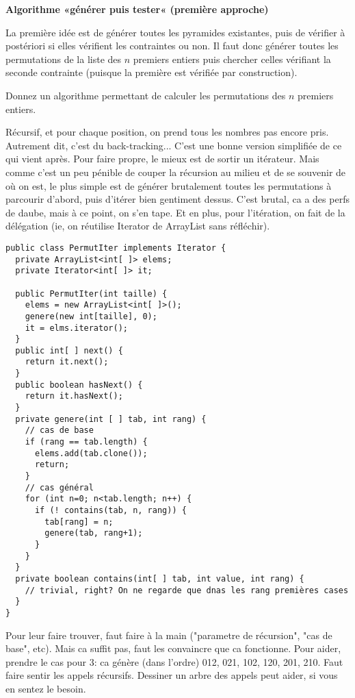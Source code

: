 \documentclass[10pt]{article}\usepackage[correction,nu]{esial}
\begin{document}
\begin{Exercice}\textbf{Algorithme «générer puis tester« (première approche)}

  \noindent La première idée est de générer toutes les pyramides existantes,
  puis de vérifier à postériori si elles vérifient les contraintes ou non. Il
  faut donc générer toutes les permutations de la liste des $n$ premiers
  entiers puis chercher celles vérifiant la seconde contrainte (puisque la
  première est vérifiée par construction).
\end{Exercice}

\begin{Question}
  Donnez un algorithme permettant de calculer les permutations des $n$ premiers
  entiers.
\end{Question}
\begin{Reponse}
  Récursif, et pour chaque position, on prend tous les nombres pas encore
  pris. Autrement dit, c'est du back-tracking... C'est une bonne version
  simplifiée de ce qui vient après. Pour faire propre, le mieux est de sortir
  un itérateur. Mais comme c'est un peu pénible de couper la récursion au
  milieu et de se souvenir de où on est, le plus simple est de générer
  brutalement toutes les permutations à parcourir d'abord, puis d'itérer bien
  gentiment dessus. C'est brutal, ca a des perfs de daube, mais à ce point, on
  s'en tape. Et en plus, pour l'itération, on fait de la délégation (ie, on
  réutilise Iterator de ArrayList sans réfléchir).

  \begin{Verbatim}
public class PermutIter implements Iterator {
  private ArrayList<int[ ]> elems;
  private Iterator<int[ ]> it;

  public PermutIter(int taille) {
    elems = new ArrayList<int[ ]>();
    genere(new int[taille], 0);
    it = elms.iterator();
  }
  public int[ ] next() {
    return it.next();
  }
  public boolean hasNext() {
    return it.hasNext();
  }
  private genere(int [ ] tab, int rang) {
    // cas de base 
    if (rang == tab.length) {
      elems.add(tab.clone());
      return;
    }
    // cas général
    for (int n=0; n<tab.length; n++) {
      if (! contains(tab, n, rang)) {
        tab[rang] = n;
        genere(tab, rang+1);
      }
    }
  }
  private boolean contains(int[ ] tab, int value, int rang) {
    // trivial, right? On ne regarde que dnas les rang premières cases
  }
}
  \end{Verbatim}
  Pour leur faire trouver, faut faire à la main ("parametre de récursion", "cas
  de base", etc). Mais ca suffit pas, faut les convaincre que ca
  fonctionne. Pour aider, prendre le cas pour 3: ca génère (dans l'ordre)
  012, 021, 102, 120, 201, 210. Faut faire sentir les appels
  récursifs. Dessiner un arbre des appels peut aider, si vous en sentez le
  besoin. 
\end{Reponse}
\end{document}
